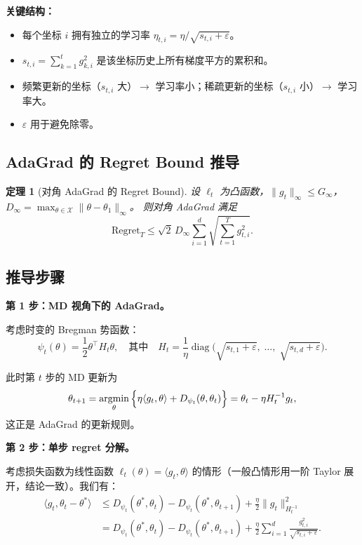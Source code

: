 \documentclass[12pt,a4paper]{ctexart}
\theoremstyle{definition}
\theoremstyle{plain}
\newtheorem{theorem}{定理}[section]
\theoremstyle{remark}
\newcommand{\cX}{\mathcal{X}}
\newcommand{\argmin}{\operatornamewithlimits{argmin}}
\newcommand{\diag}{\operatorname{diag}}
\newcommand{\Regret}{\mathrm{Regret}}
\begin{document}
\textbf{关键结构：}
\begin{itemize}
  \item 每个坐标 $i$ 拥有独立的学习率 $\eta_{t,i} = \eta / \sqrt{s_{t,i} + \varepsilon}$。
  \item $s_{t,i} = \sum_{k=1}^{t} g_{k,i}^2$ 是该坐标历史上所有梯度平方的累积和。
  \item 频繁更新的坐标（$s_{t,i}$ 大）$\to$ 学习率小；稀疏更新的坐标（$s_{t,i}$ 小）$\to$ 学习率大。
  \item $\varepsilon$ 用于避免除零。
\end{itemize}

\subsection{AdaGrad 的 Regret Bound 推导}

\begin{theorem}[对角 AdaGrad 的 Regret Bound]\label{thm:adagrad-bound}
设 $\ell_t$ 为凸函数，$\|g_t\|_\infty \le G_\infty$，$D_\infty = \max_{\theta\in\cX} \|\theta - \theta_1\|_\infty$。
则对角 AdaGrad 满足
\begin{equation}\label{eq:adagrad-main}
  \Regret_T \le \sqrt{2}\, D_\infty \sum_{i=1}^{d} \sqrt{\sum_{t=1}^{T} g_{t,i}^2}.
\end{equation}
\end{theorem}

\subsection*{推导步骤}

\textbf{第 1 步：MD 视角下的 AdaGrad。}

考虑时变的 Bregman 势函数：
\[
  \psi_t(\theta) = \frac{1}{2} \theta^\top H_t \theta,
  \quad \text{其中} \quad H_t = \frac{1}{\eta}\diag\big(\sqrt{s_{t,1}+\varepsilon},\; \dots,\; \sqrt{s_{t,d}+\varepsilon}\big).
\]

此时第 $t$ 步的 MD 更新为
\[
  \theta_{t+1} = \argmin_{\theta} \Big\{ \eta\langle g_t, \theta \rangle + D_{\psi_t}(\theta, \theta_t) \Big\}
            = \theta_t - \eta H_t^{-1} g_t,
\]
这正是 AdaGrad 的更新规则。

\textbf{第 2 步：单步 regret 分解。}

考虑损失函数为线性函数 $\ell_t(\theta) = \langle g_t, \theta \rangle$ 的情形（一般凸情形用一阶 Taylor 展开，结论一致）。我们有：
\begin{align}
  \langle g_t, \theta_t - \theta^*\rangle
  &\le D_{\psi_t}(\theta^*, \theta_t) - D_{\psi_t}(\theta^*, \theta_{t+1})
     + \frac{\eta}{2}\|g_t\|_{H_t^{-1}}^2 \label{eq:step-decomp} \\
  &= D_{\psi_t}(\theta^*, \theta_t) - D_{\psi_t}(\theta^*, \theta_{t+1})
     + \frac{\eta}{2} \sum_{i=1}^{d} \frac{g_{t,i}^2}{\sqrt{s_{t,i}+\varepsilon}}.
\end{align}
\end{document}
